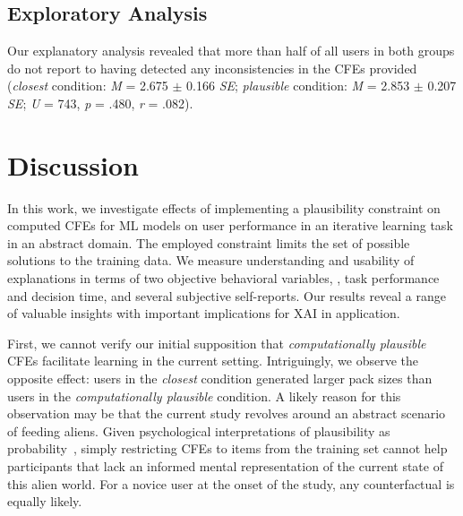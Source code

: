 \subsection{Exploratory Analysis}
Our explanatory analysis revealed that more than half of all users in both groups do not report to having detected any inconsistencies in the \glspl{CFE} provided (\textit{closest} condition: \textit{M} = 2.675 $\pm$ 0.166 \textit{SE}; \textit{plausible} condition: \textit{M} = 2.853 $\pm$ 0.207 \textit{SE}; \textit{U} = 743, \textit{p} = .480, \textit{r} = .082).

\section{Discussion}\label{sec:discussion}

In this work, we investigate effects of implementing a plausibility constraint on computed \glspl{CFE} for \gls{ML} models on user performance in an iterative learning task in an abstract domain. 
The employed constraint limits the set of possible solutions to the training data.
We measure understanding and usability of explanations in terms of two objective behavioral variables, \ie, task performance and decision time, and several subjective self-reports. 
Our results reveal a range of valuable insights with important implications for \gls{XAI} in application.

First, we cannot verify our initial supposition that \textit{computationally plausible} \glspl{CFE} facilitate learning in the current setting. 
Intriguingly, we observe the opposite effect: users in the \textit{closest} condition generated larger pack sizes than users in the \textit{computationally plausible} condition.
A likely reason for this observation may be that the current study revolves around an abstract scenario of feeding aliens. 
Given psychological interpretations of plausibility as probability~\citep{pezdek_is_2006, de_brigard_remembering_2013}, simply restricting \glspl{CFE} to items from the training set cannot help participants that lack an informed mental representation of the current state of this alien world. 
For a novice user at the onset of the study, any counterfactual is equally likely.

